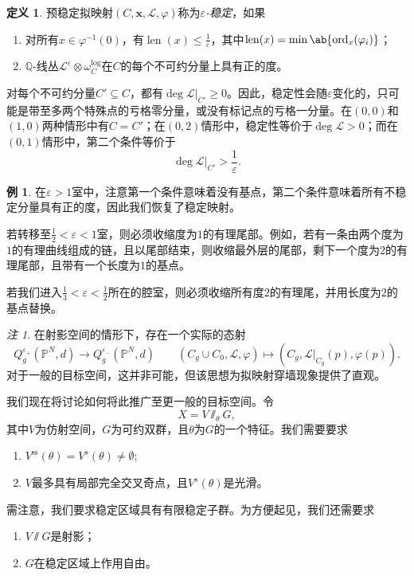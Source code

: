 \documentclass{amsart}
\theoremstyle{definition}
\newtheorem{defn}[thm]{定义}
\newtheorem{exm}[thm]{例}
\theoremstyle{remark}
\newtheorem{rmk}[thm]{注}
\theoremstyle{plain}
\theoremstyle{definition}
\theoremstyle{remark}
\newcommand{\Q}{\mathbb{Q}}
\renewcommand{\P}{\mathbb{P}}
\newcommand{\ep}{\varepsilon}
\newcommand{\mc}[1]{\mathcal{#1}}
\newcommand{\mr}[1]{\mathrm{#1}}
\newcommand{\on}[1]{\operatorname{#1}}
\newcommand{\1}{\mathbf{1}}
\newcommand{\2}{\mathbf{2}}
\newcommand{\3}{\mathbf{3}}
\begin{document}
\begin{defn}
    预稳定拟映射\((C, \mathbf{x}, \mc{L}, \varphi)\)称为\textit{\(\ep\)-稳定}，如果
    \begin{enumerate}
        \item 对所有\(x \in \varphi^{-1}(0)\)，有\(\on{len}(x) \leq \frac{1}{\ep}\)，其中\(\on{len}(x) = \min \ab\{ \on{ord}_x (\varphi_i)\}\)；
        \item \(\Q\)-线丛\(\mc{L}^{\ep} \otimes \omega_C^{\log}\)在\(C\)的每个不可约分量上具有正的度。
    \end{enumerate}
\end{defn}

对每个不可约分量\(C' \subseteq C\)，都有\(\deg \mc{L}|_{C'} \geq 0\)。因此，稳定性会随\(\ep\)变化的，只可能是带至多两个特殊点的亏格零分量，或没有标记点的亏格一分量。在\((0,0)\)和\((1,0)\)两种情形中有\(C=C'\)；在\((0,2)\)情形中，稳定性等价于\(\deg\mc{L}>0\)；而在\((0,1)\)情形中，第二个条件等价于
\[ \deg \mc{L}|_{C'} > \frac{1}{\ep}. \]

\begin{exm}
    在\(\ep > 1\)室中，注意第一个条件意味着没有基点，第二个条件意味着所有不稳定分量具有正的度，因此我们恢复了稳定映射。

    若转移至\(\frac{1}{2} < \ep < 1\)室，则必须收缩度为\(1\)的有理尾部。例如，若有一条由两个度为\(1\)的有理曲线组成的链，且以尾部结束，则收缩最外层的尾部，剩下一个度为\(2\)的有理尾部，且带有一个长度为\(1\)的基点。

若我们进入\(\frac{1}{3} < \ep < \frac{1}{2}\)所在的腔室，则必须收缩所有度\(2\)的有理尾，并用长度为\(2\)的基点替换。
\end{exm}

\begin{rmk}
在射影空间的情形下，存在一个实际的态射
    \[ Q_g^{\ep_+}(\P^N, d) \to Q_g^{\ep_-}(\P^N, d) \qquad (C_g \cup C_0, \mc{L}, \varphi) \mapsto (C_g, \mc{L}|_{C_g}(p), \varphi(p)). \]
对于一般的目标空间，这并非可能，但该思想为拟映射穿墙现象提供了直观。
\end{rmk}

我们现在将讨论如何将此推广至更一般的目标空间。令
\[ X = V \sslash_{\theta} G, \]
其中\(V\)为仿射空间，\(G\)为可约双群，且\(\theta\)为\(G\)的一个特征。我们需要要求
\begin{enumerate}
    \item \(V^{\mr{ss}}(\theta) = V^s(\theta) \neq \emptyset\);
    \item \(V\)最多具有局部完全交叉奇点，且\(V^s(\theta)\)是光滑。
\end{enumerate}
需注意，我们要求稳定区域具有有限稳定子群。为方便起见，我们还需要求
\begin{enumerate}
    \item \(V \sslash G\)是射影；
\item \(G\)在稳定区域上作用自由。
\end{enumerate}
\end{document}
